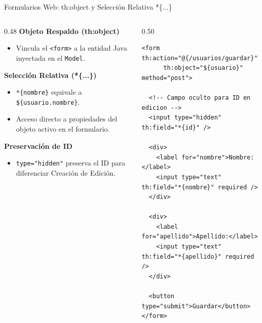 \documentclass[aspectratio=169]{beamer}
\begin{document}
\begin{frame}[fragile]{Formularios Web: th:object y Selecci\'on Relativa *\{...\}}
\begin{columns}[c]
\begin{column}{0.48\textwidth}
  \textbf{Objeto Respaldo (th:object)}
  \begin{itemize}
    \item Vincula el \texttt{<form>} a la entidad Java inyectada en el \texttt{Model}.
  \end{itemize}
  \vspace{3pt}
  \textbf{Selecci\'on Relativa (*\{...\})}
  \begin{itemize}
    \item \texttt{*\{nombre\}} equivale a \texttt{\$\{usuario.nombre\}}.
    \item Acceso directo a propiedades del objeto activo en el formulario.
  \end{itemize}
  \vspace{3pt}
  \textbf{Preservaci\'on de ID}
  \begin{itemize}
    \item \texttt{type="hidden"} preserva el ID para diferenciar Creaci\'on de Edici\'on.
  \end{itemize}
\end{column}
\begin{column}{0.50\textwidth}
\begin{lstlisting}[style=ThymeleafStyle]
<form th:action="@{/usuarios/guardar}" 
      th:object="${usuario}" method="post">

  <!-- Campo oculto para ID en edicion -->
  <input type="hidden" th:field="*{id}" />

  <div>
    <label for="nombre">Nombre:</label>
    <input type="text" th:field="*{nombre}" required />
  </div>

  <div>
    <label for="apellido">Apellido:</label>
    <input type="text" th:field="*{apellido}" required />
  </div>

  <button type="submit">Guardar</button>
</form>
\end{lstlisting}
\end{column}
\end{columns}
\end{frame}
\end{document}
